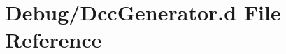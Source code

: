 \hypertarget{Debug_2DccGenerator_8d}{}\section{Debug/\+Dcc\+Generator.d File Reference}
\label{Debug_2DccGenerator_8d}
